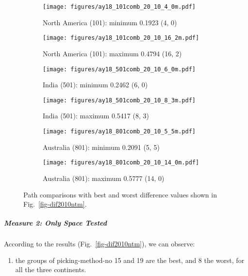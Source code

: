 \begin{figure*}
	\centering
	\begin{subfigure}{.43\textwidth}
		\texttt{[image: figures/ay18\_101comb\_20\_10\_4\_0m.pdf]}
		\caption{North America (101): minimum 0.1923 (4, 0)}\label{fig-nant-201040m}
	\end{subfigure}
	\begin{subfigure}{.43\textwidth}
		\texttt{[image: figures/ay18\_101comb\_20\_10\_16\_2m.pdf]}
		\caption{North America (101): maximum 0.4794 (16, 2)}\label{fig-nant-2010162m}
	\end{subfigure}
	\vspace{.1em}
	\begin{subfigure}{.43\textwidth}
		\texttt{[image: figures/ay18\_501comb\_20\_10\_6\_0m.pdf]}
		\caption{India (501): minimum 0.2462 (6, 0)}\label{fig-indnt-201060m}
	\end{subfigure}
	\begin{subfigure}{.43\textwidth}
		\texttt{[image: figures/ay18\_501comb\_20\_10\_8\_3m.pdf]}
		\caption{India (501): maximum 0.5417 (8, 3)}\label{fig-indnt-201083m}
	\end{subfigure}
	\vspace{.1em}
	\begin{subfigure}{.43\textwidth}
		\texttt{[image: figures/ay18\_801comb\_20\_10\_5\_5m.pdf]}
		\caption{Australia (801): minimum 0.2091 (5, 5)}\label{fig-aunt-201055m}
	\end{subfigure}
	\begin{subfigure}{.43\textwidth}
		\texttt{[image: figures/ay18\_801comb\_20\_10\_14\_0m.pdf]}
		\caption{Australia (801): maximum 0.5777 (14, 0)}\label{fig-aunt-2010140m}
	\end{subfigure}
	\caption[Best and worst differences without shape test (20 Myr bin, 10 Myr
step)]{Path comparisons with best and worst difference values shown in
Fig.~\ref{fig-dif2010ntm}.}\label{fig-dif2010ntbwm}
\end{figure*}

\subparagraph{Measure 2: Only Space Tested}

According to the results (Fig.~\ref{fig-dif2010ntm}), we can observe:
%
\begin{enumerate}
  \item the groups of picking-method-no 15 and 19 are the best, and 8 the worst,
		for all the three continents.
\end{enumerate}

